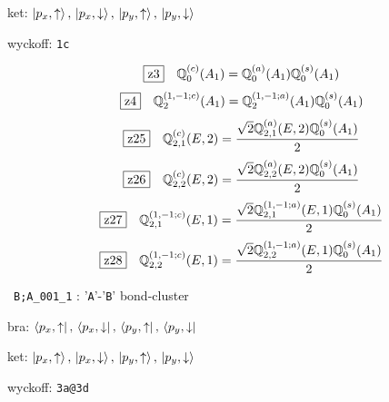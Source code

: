 \documentclass[fleqn,10pt,landscape]{jsarticle}
\begin{document}
\noindent\quad * ket: $\ket{p_{x},\uparrow},\, \ket{p_{x},\downarrow},\, \ket{p_{y},\uparrow},\, \ket{p_{y},\downarrow}$

\noindent\quad * wyckoff: \texttt{1c}

\begin{dmath*}
\hspace*{3mm}\fbox{z3}\quad \mathbb{Q}_{0}^{(c)}(A_{1})=\mathbb{Q}_{0}^{(a)}(A_{1}) \mathbb{Q}_{0}^{(s)}(A_{1})
\end{dmath*}
\begin{dmath*}
\hspace*{3mm}\fbox{z4}\quad \mathbb{Q}_{2}^{(1,-1;c)}(A_{1})=\mathbb{Q}_{2}^{(1,-1;a)}(A_{1}) \mathbb{Q}_{0}^{(s)}(A_{1})
\end{dmath*}
\begin{dmath*}
\hspace*{3mm}\fbox{z25}\quad \mathbb{Q}_{2,1}^{(c)}(E,2)=\frac{\sqrt{2} \mathbb{Q}_{2,1}^{(a)}(E,2) \mathbb{Q}_{0}^{(s)}(A_{1})}{2}
\end{dmath*}
\begin{dmath*}
\hspace*{3mm}\fbox{z26}\quad \mathbb{Q}_{2,2}^{(c)}(E,2)=\frac{\sqrt{2} \mathbb{Q}_{2,2}^{(a)}(E,2) \mathbb{Q}_{0}^{(s)}(A_{1})}{2}
\end{dmath*}
\begin{dmath*}
\hspace*{3mm}\fbox{z27}\quad \mathbb{Q}_{2,1}^{(1,-1;c)}(E,1)=\frac{\sqrt{2} \mathbb{Q}_{2,1}^{(1,-1;a)}(E,1) \mathbb{Q}_{0}^{(s)}(A_{1})}{2}
\end{dmath*}
\begin{dmath*}
\hspace*{3mm}\fbox{z28}\quad \mathbb{Q}_{2,2}^{(1,-1;c)}(E,1)=\frac{\sqrt{2} \mathbb{Q}_{2,2}^{(1,-1;a)}(E,1) \mathbb{Q}_{0}^{(s)}(A_{1})}{2}
\end{dmath*}
\vspace{5mm}

\noindent\textbullet\, \texttt{B;A_001_1} : '\texttt{A}'-'\texttt{B}' bond-cluster

\noindent\quad * bra: $\bra{p_{x},\uparrow},\, \bra{p_{x},\downarrow},\, \bra{p_{y},\uparrow},\, \bra{p_{y},\downarrow}$

\noindent\quad * ket: $\ket{p_{x},\uparrow},\, \ket{p_{x},\downarrow},\, \ket{p_{y},\uparrow},\, \ket{p_{y},\downarrow}$

\noindent\quad * wyckoff: \texttt{3a@3d}
\end{document}
